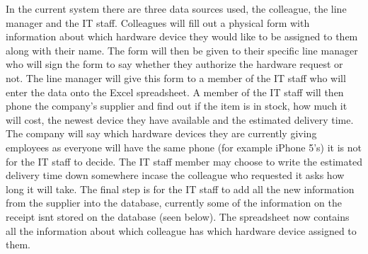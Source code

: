 In the current system there are three data sources used, the colleague, the line manager and the IT staff. Colleagues will fill out a physical form with information about which hardware device they would like to be assigned to them along with their name. The form will then be given to their specific line manager who will sign the form to say whether they authorize the hardware request or not. The line manager will give this form to a member of the IT staff who will enter the data onto the Excel spreadsheet. A member of the IT staff will then phone the company's supplier and find out if the item is in stock, how much it will cost, the newest device they have available and the estimated delivery time. The company will say which hardware devices they are currently giving employees as everyone will have the same phone (for example iPhone 5's) it is not for the IT staff to decide. The IT staff member may choose to write the estimated delivery time down somewhere incase the colleague who requested it asks how long it will take. The final step is for the IT staff to add all the new information from the supplier into the database, currently some of the information on the receipt isnt stored on the database (seen below). The spreadsheet now contains all the information about which colleague has which hardware device assigned to them.

